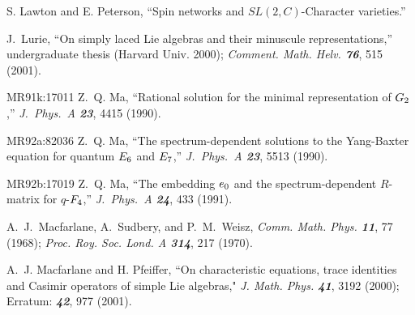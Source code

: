 
 S. Lawton and E. Peterson,
        ``Spin networks and $SL(2,C)$-Character varieties.''

%

 J.~Lurie,   %
    ``On simply laced Lie algebras and
    their minuscule representations,''
    undergraduate thesis (Harvard Univ. 2000);
    {\em Comment. Math. Helv. \bf 76},  515 (2001). %




        {MR91k:17011} Z.~Q. Ma,
``Rational solution for the minimal representation of $G\sb 2$,''
{\em J.~Phys.~A  \bf 23}, 4415 (1990).

        {MR92a:82036} Z.~Q. Ma,
``The spectrum-dependent solutions to the Yang-Baxter
  equation for quantum $E\sb 6$ and $E\sb 7$,''
{\em J.~Phys.~A  \bf 23}, 5513 (1990).

        {MR92b:17019} Z.~Q. Ma,
``The embedding $e\sb 0$ and the spectrum-dependent
  $R$-matrix for $q$-$F\sb 4$,''
{\em J.~Phys.~A  \bf 24}, 433 (1991).

 A.~J.~Macfarlane, A.~Sudbery, and P.~M.~Weisz,
    {\em Comm. Math. Phys.  \bf 11}, 77 (1968);
    {\em Proc. Roy. Soc. Lond.  A \bf 314}, 217 (1970).

%
 A.~J.  Macfarlane and H. Pfeiffer,
    ``On characteristic equations, trace identities
  and Casimir operators of simple Lie algebras,"
  {\em J. Math. Phys. \bf 41}, 3192 (2000); %
  Erratum: {\em \bf 42}, 977 (2001).

